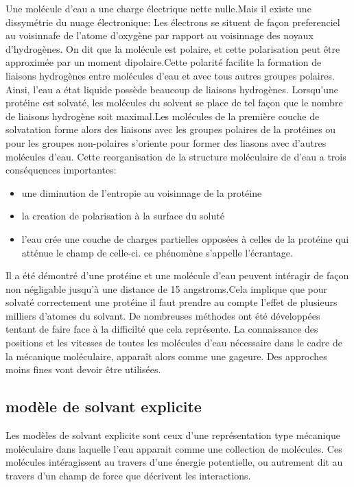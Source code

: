 Une molécule d'eau a une charge électrique nette nulle.Mais il existe une dissymétrie du nuage électronique: Les électrons se situent de façon preferenciel au voisinnafe de l'atome d'oxygène par rapport au voisinnage des noyaux d'hydrogènes.
On dit que la molécule est polaire, et cette polarisation peut être approximée par un moment dipolaire.Cette polarité facilite la formation de liaisons hydrogènes entre molécules d'eau et avec tous autres groupes polaires. 
Ainsi, l'eau a état liquide possède beaucoup de liaisons hydrogènes. Lorsqu'une protéine est solvaté, les molécules du solvent se place de tel façon que le nombre de liaisons hydrogène soit maximal.Les molécules de la première couche de solvatation forme alors des liaisons avec les groupes polaires de la protéines ou pour les groupes non-polaires s'oriente pour former des liasons avec d'autres molécules d'eau. Cette reorganisation de la structure moléculaire de d'eau a trois conséquences importantes:

\begin{itemize}
\item une diminution de l'entropie au voisinnage de la protéine 
\item la creation de polarisation à la surface du soluté
\item  l'eau crée une couche de charges partielles opposées à celles de la protéine qui atténue le champ de celle-ci. ce phénomène s'appelle l'écrantage.
\end{itemize}
  
Il a été démontré d'une protéine et une molécule d'eau peuvent intéragir de façon non négligable jusqu'à une distance de 15 angstroms.Cela implique que pour solvaté correctement une protéine il faut prendre au compte l'effet de plusieurs milliers d'atomes du solvant.
De nombreuses méthodes ont été développées tentant de faire face à la difficilté que cela représente.
La connaissance des positions et les vitesses de toutes les molécules d'eau nécessaire dans le cadre de la mécanique moléculaire, apparaît alors comme une gageure. Des approches moins fines vont devoir être utilisées. 

\subsection{modèle de solvant explicite}

Les modèles de solvant explicite sont ceux d'une représentation type mécanique moléculaire dans laquelle l'eau apparait comme une collection de molécules. Ces molécules intéragissent au travers d'une énergie potentielle, ou autrement dit au travers d'un champ de force que décrivent les interactions.


